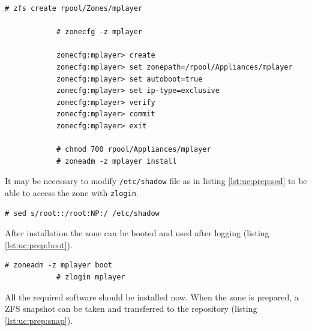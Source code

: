 \documentclass[11pt]{book}
\begin{document}
        \noindent
        \begin{minipage}{\textwidth}
          \begin{lstlisting}[caption={New zone creation},label={lst:uc:prep:create}]
            # zfs create rpool/Zones/mplayer

            # zonecfg -z mplayer

            zonecfg:mplayer> create
            zonecfg:mplayer> set zonepath=/rpool/Appliances/mplayer
            zonecfg:mplayer> set autoboot=true
            zonecfg:mplayer> set ip-type=exclusive
            zonecfg:mplayer> verify
            zonecfg:mplayer> commit
            zonecfg:mplayer> exit

            # chmod 700 rpool/Appliances/mplayer
            # zoneadm -z mplayer install
          \end{lstlisting}
        \end{minipage}

        \noindent
        It may be necessary to modify \texttt{/etc/shadow} file as in listing \ref{lst:uc:prep:sed} to be able to access
        the zone with \texttt{zlogin}. \\

        \noindent
        \begin{minipage}{\textwidth}
          \begin{lstlisting}[caption={\texttt{/etc/shadow} file adjustment},label={lst:uc:prep:sed}]
            # sed s/root::/root:NP:/ /etc/shadow
          \end{lstlisting}
        \end{minipage}

        \noindent
        After installation the zone can be booted and used after logging (listing \ref{lst:uc:prep:boot}). \\

        \noindent
        \begin{minipage}{\textwidth}
          \begin{lstlisting}[caption={Booting and logging into a zone},label={lst:uc:prep:boot}]
            # zoneadm -z mplayer boot
            # zlogin mplayer
          \end{lstlisting}
        \end{minipage}

        \noindent
        All the required software should be installed now. When the zone is prepared, a ZFS snapshot can be taken and
        transferred to the repository (listing \ref{lst:uc:prep:snap}). \\
\end{document}
